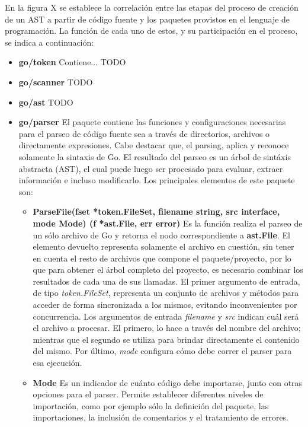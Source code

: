 En la figura X se establece la correlación entre las etapas del proceso de creación de un AST a partir de código fuente y los paquetes provistos en el lenguaje de programación.
La función de cada uno de estos, y su participación en el proceso, se indica a continuación:
\begin{itemize}
  \item \textbf{go/token} Contiene... TODO
  
  \item \textbf{go/scanner} TODO
  
  \item \textbf{go/ast} TODO
  
  \item \textbf{go/parser} El paquete contiene las funciones y configuraciones necesarias para el parseo de código fuente sea a través de directorios, archivos o directamente expresiones. Cabe destacar que, el parsing, aplica y reconoce solamente la sintaxis de Go.
  El resultado del parseo es un árbol de sintáxis abstracta (AST), el cual puede luego ser procesado para evaluar, extraer información e incluso modificarlo.
  Los principales elementos de este paquete son:
  
  \begin{itemize}
    \item \textbf{ParseFile(fset *token.FileSet, filename string, src interface{}, mode Mode) (f *ast.File, err error)} Es la función realiza el parseo de un sólo archivo de Go y retorna el nodo correspondiente a \textbf{ast.File}.
    El elemento devuelto representa solamente el archivo en cuestión, sin tener en cuenta el resto de archivos que compone el paquete/proyecto, por lo que para obtener el árbol completo del proyecto, es necesario combinar los resultados de cada una de sus llamadas.
    El primer argumento de entrada, de tipo \textit{token.FileSet}, representa un conjunto de archivos y métodos para acceder de forma sincronizada a los mismos, evitando inconvenientes por concurrencia.
    Los argumentos de entrada \textit{filename} y \textit{src} indican cuál será el archivo a procesar.
    El primero, lo hace a través del nombre del archivo; mientras que el segundo se utiliza para brindar directamente el contenido del mismo.
    Por último, \textit{mode} configura cómo debe correr el parser para esa ejecución.

    \item \textbf{Mode} Es un indicador de cuánto código debe importarse, junto con otras opciones para el parser.
    Permite establecer diferentes niveles de importación, como por ejemplo sólo la definición del paquete, las importaciones, la inclusión de comentarios y el tratamiento de errores.
    
  \end{itemize}
  
\end{itemize}
